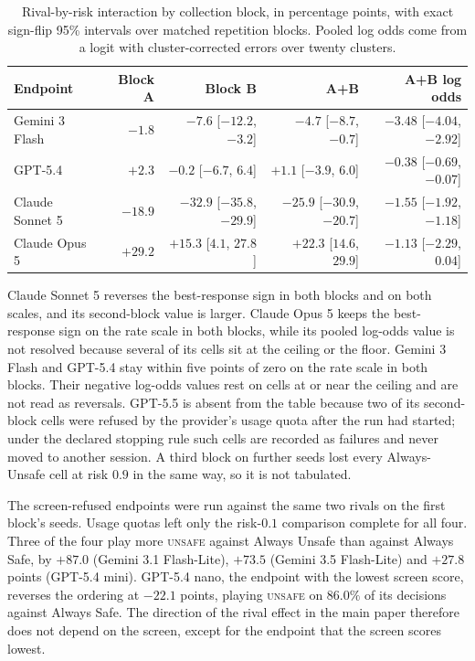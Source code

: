 \documentclass{article}
\newcommand{\Unsafe}{\textsc{unsafe}}
\begin{document}
\begin{table}[t]
\caption{Rival-by-risk interaction by collection block, in percentage points,
with exact sign-flip 95\% intervals over matched repetition blocks. Pooled
log odds come from a logit with cluster-corrected errors over twenty clusters.}
\label{tab:supp-replication}
\centering
\footnotesize
\setlength{\tabcolsep}{3pt}
\begin{tabular}{@{}lrrrr@{}}
\toprule
Endpoint & Block A & Block B & A+B & A+B log odds \\
\midrule
Gemini 3 Flash  & $-1.8$ & $-7.6$ [$-12.2$, $-3.2$] & $-4.7$ [$-8.7$, $-0.7$] & $-3.48$ [$-4.04$, $-2.92$] \\
GPT-5.4         & $+2.3$ & $-0.2$ [$-6.7$, $6.4$] & $+1.1$ [$-3.9$, $6.0$] & $-0.38$ [$-0.69$, $-0.07$] \\
Claude Sonnet 5 & $-18.9$ & $-32.9$ [$-35.8$, $-29.9$] & $-25.9$ [$-30.9$, $-20.7$] & $-1.55$ [$-1.92$, $-1.18$] \\
Claude Opus 5   & $+29.2$ & $+15.3$ [$4.1$, $27.8$] & $+22.3$ [$14.6$, $29.9$] & $-1.13$ [$-2.29$, $0.04$] \\
\bottomrule
\end{tabular}
\end{table}

Claude Sonnet 5 reverses the best-response sign in both blocks and on both
scales, and its second-block value is larger. Claude Opus 5 keeps the
best-response sign on the rate scale in both blocks, while its pooled log-odds
value is not resolved because several of its cells sit at the ceiling or the
floor. Gemini 3 Flash and GPT-5.4 stay within five points of zero on the rate
scale in both blocks. Their negative log-odds values rest on cells at or near
the ceiling and are not read as reversals. GPT-5.5 is absent from the table
because two of its second-block cells were refused by the provider's usage
quota after the run had started; under the declared stopping rule such cells
are recorded as failures and never moved to another session. A third block on
further seeds lost every Always-Unsafe cell at risk $0.9$ in the same way, so it
is not tabulated.

The screen-refused endpoints were run against the same two rivals on the first
block's seeds. Usage quotas left only the risk-$0.1$ comparison complete for all
four. Three of the four play more \Unsafe{} against Always Unsafe than against
Always Safe, by $+87.0$ (Gemini 3.1 Flash-Lite), $+73.5$ (Gemini 3.5 Flash-Lite)
and $+27.8$ points (GPT-5.4 mini). GPT-5.4 nano, the endpoint with the lowest
screen score, reverses the ordering at $-22.1$ points, playing \Unsafe{} on
$86.0\%$ of its decisions against Always Safe. The direction of the rival effect
in the main paper therefore does not depend on the screen, except for the
endpoint that the screen scores lowest.
\end{document}
